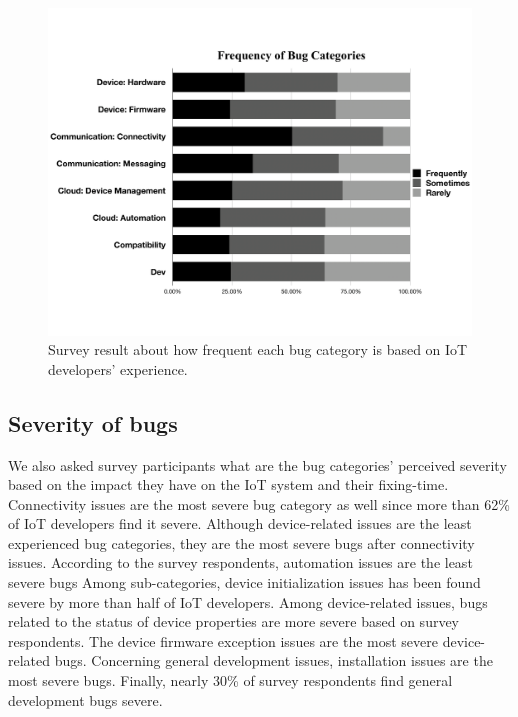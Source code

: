  \begin{figure}%
  \centering
   \includegraphics[width=\linewidth]{imgs/bugFreq}
  \caption{Survey result about how frequent each bug category is based on IoT developers' experience.}
  \label{fig:bugFreq}
\end{figure}

\subsection{Severity of bugs}
We also asked survey participants what are the bug categories' perceived severity based on the impact they have on the IoT system and their fixing-time. Connectivity issues are the most severe bug category as well since more than 62\% of IoT developers find it severe. Although device-related issues are the least experienced bug categories, they are the most severe bugs after connectivity issues. According to the survey respondents, automation issues are the least severe bugs Among sub-categories, device initialization issues has been found severe by more than half of IoT developers. Among device-related issues, bugs related to the status of device properties are more severe based on survey respondents. The device firmware exception issues are the most severe device-related bugs. Concerning general development issues, installation issues are the most  severe bugs. Finally, nearly 30\% of survey respondents find general development bugs severe.

